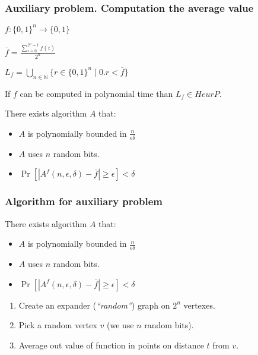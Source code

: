 \begin{frame}
    \frametitle{Auxiliary problem. Computation the average value}

    $f:\{0, 1\}^{n} \rightarrow \{0, 1\}$
    
    $\overline{f} = \frac{\sum\limits_{i = 0}^{2^n - 1}f(i)}{2^n}$

    $L_f = \bigcup\limits_{n \in \mathbb{N}}\{r \in \{0, 1\}^n \mid 0.r < \overline{f}\}$

    \begin{lemma}
        If $f$ can be computed in polynomial time than $L_f \in HeurP$.
    \end{lemma}

    \begin{statement}
        There exists algorithm $A$ that:
        \begin{itemize}
	        \item $A$ is polynomially bounded in $\frac{n}{\epsilon\delta}$
        	\item $A$ uses $n$ random bits.
        	\item $\Pr[|A^{f}(n, \epsilon, \delta) - \overline{f}| \ge \epsilon] <
		        \delta$
        \end{itemize}
    \end{statement}
\end{frame}


\begin{frame}
    \frametitle{Algorithm for auxiliary problem}

    \begin{statement}
        There exists algorithm $A$ that:
        \begin{itemize}
	        \item $A$ is polynomially bounded in $\frac{n}{\epsilon\delta}$
        	\item $A$ uses $n$ random bits.
        	\item $\Pr[|A^{f}(n, \epsilon, \delta) - \overline{f}| \ge \epsilon] <
		        \delta$
        \end{itemize}
    \end{statement}

    \begin{enumerate}
 		\item Create an expander ({\it ``random''}) graph on $2^n$ vertexes.
    	\item Pick a random vertex $v$ (we use $n$ random bits).
    	\item Average out value of function in points on distance $t$ from $v$.
    \end{enumerate}
    
\end{frame}

